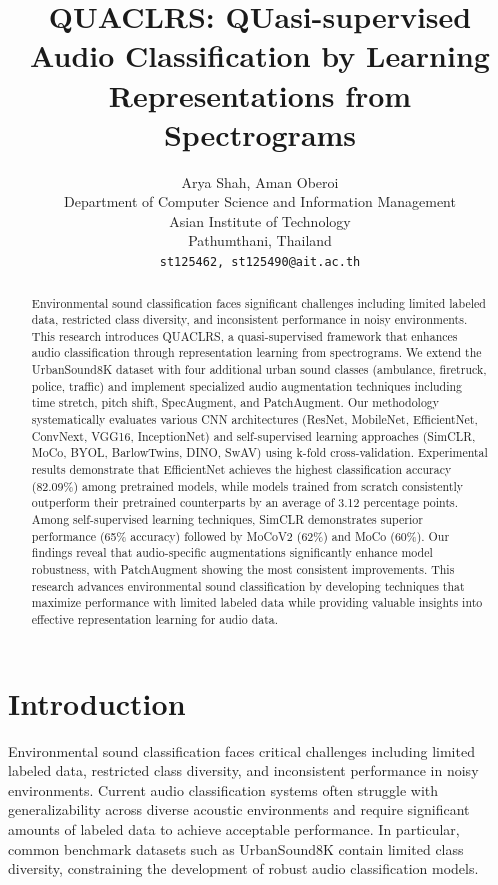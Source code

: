 \documentclass[11pt]{article}
\title{QUACLRS: QUasi-supervised Audio Classification by Learning Representations from Spectrograms}
\author{Arya Shah, Aman Oberoi \\
         Department of Computer Science and Information Management\\ Asian Institute of Technology \\ Pathumthani, Thailand \\ \texttt{{{st125462, st125490}@ait.ac.th}}}
\begin{document}
\maketitle
\begin{abstract}
Environmental sound classification faces significant challenges including limited labeled data, restricted class diversity, and inconsistent performance in noisy environments. This research introduces QUACLRS, a quasi-supervised framework that enhances audio classification through representation learning from spectrograms. We extend the UrbanSound8K dataset with four additional urban sound classes (ambulance, firetruck, police, traffic) and implement specialized audio augmentation techniques including time stretch, pitch shift, SpecAugment, and PatchAugment. Our methodology systematically evaluates various CNN architectures (ResNet, MobileNet, EfficientNet, ConvNext, VGG16, InceptionNet) and self-supervised learning approaches (SimCLR, MoCo, BYOL, BarlowTwins, DINO, SwAV) using k-fold cross-validation. Experimental results demonstrate that EfficientNet achieves the highest classification accuracy (82.09\%) among pretrained models, while models trained from scratch consistently outperform their pretrained counterparts by an average of 3.12 percentage points. Among self-supervised learning techniques, SimCLR demonstrates superior performance (65\% accuracy) followed by MoCoV2 (62\%) and MoCo (60\%). Our findings reveal that audio-specific augmentations significantly enhance model robustness, with PatchAugment showing the most consistent improvements. This research advances environmental sound classification by developing techniques that maximize performance with limited labeled data while providing valuable insights into effective representation learning for audio data.
\end{abstract}

\section{Introduction}

Environmental sound classification faces critical challenges including limited labeled data, restricted class diversity, and inconsistent performance in noisy environments. Current audio classification systems often struggle with generalizability across diverse acoustic environments and require significant amounts of labeled data to achieve acceptable performance. In particular, common benchmark datasets such as UrbanSound8K contain limited class diversity, constraining the development of robust audio classification models.
\end{document}
